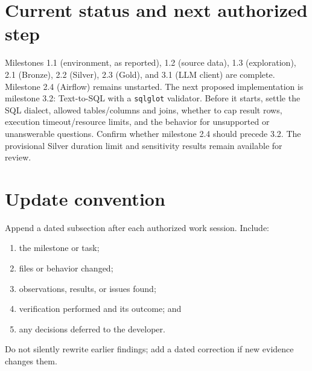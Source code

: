 \documentclass[11pt,a4paper]{article}
\begin{document}
\section{Current status and next authorized step}
Milestones 1.1 (environment, as reported), 1.2 (source data), 1.3
(exploration), 2.1 (Bronze), 2.2 (Silver), 2.3 (Gold), and 3.1 (LLM client)
are complete. Milestone 2.4 (Airflow) remains unstarted. The next proposed
implementation is milestone 3.2: Text-to-SQL with a \texttt{sqlglot} validator.
Before it starts, settle the SQL dialect, allowed tables/columns and joins,
whether to cap result rows, execution timeout/resource limits, and the behavior
for unsupported or unanswerable questions. Confirm whether milestone 2.4 should
precede 3.2. The provisional Silver duration limit and sensitivity results
remain available for review.

\section{Update convention}
Append a dated subsection after each authorized work session. Include:
\begin{enumerate}
  \item the milestone or task;
  \item files or behavior changed;
  \item observations, results, or issues found;
  \item verification performed and its outcome; and
  \item any decisions deferred to the developer.
\end{enumerate}
Do not silently rewrite earlier findings; add a dated correction if new
evidence changes them.
\end{document}
